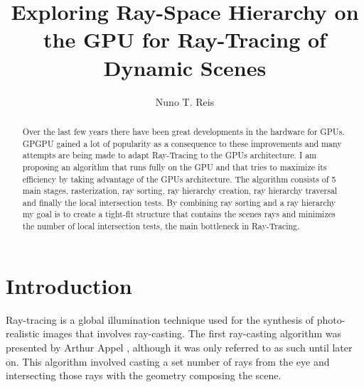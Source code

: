 \documentclass{llncs}
\begin{document}
%

%
\mainmatter              %
%

%
\title{Exploring Ray-Space Hierarchy on the GPU for Ray-Tracing of Dynamic Scenes}
%
%

%
\author{Nuno T. Reis}
%
%
%

%
%

\maketitle              %

\begin{abstract}

Over the last few years there have been great developments in the hardware for GPUs. GPGPU gained a lot of popularity as a consequence to these improvements
and many attempts are being made to adapt Ray-Tracing to the GPUs architecture. I am proposing an algorithm that runs fully on the GPU and that tries to maximize
its efficiency by taking advantage of the GPUs architecture. The algorithm consists of 5 main stages, rasterization, ray sorting, ray hierarchy creation, ray hierarchy
traversal and finally the local intersection tests. By combining ray sorting and a ray hierarchy my goal is to create a tight-fit structure that contains the scenes rays and
minimizes the number of local intersection tests, the main bottleneck in Ray-Tracing.


\end{abstract}

%
\section{Introduction}
%

Ray-tracing is a global illumination technique used for the synthesis of photo-realistic images that involves ray-casting.
The first ray-casting algorithm was presented by Arthur Appel \cite{Appel68}, although it was only referred to as such until later on. 
This algorithm involved casting a set number of rays from the eye and intersecting those rays with the geometry composing the scene. 
\end{document}
